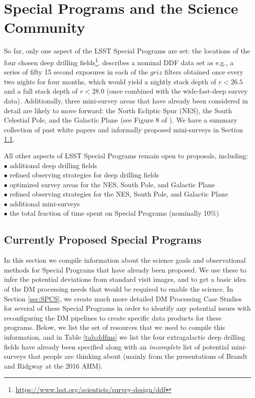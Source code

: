 \documentclass[DM,lsstdraft,toc]{lsstdoc}
\begin{document}
\clearpage
\section{Special Programs and the Science Community}\label{sec:SP_SC}

So far, only one aspect of the LSST Special Programs are set: the locations of the four chosen deep drilling fields\footnote{\url{https://www.lsst.org/scientists/survey-design/ddf}}. \cite{2008arXiv0805.2366I} describes a nominal DDF data set as e.g., a series of fifty 15 second exposures in each of the $griz$ filters obtained once every two nights for four months, which would yield a nightly stack depth of $r<26.5$ and a full stack depth of $r<28.0$ (once combined with the wide-fast-deep survey data). Additionally, three mini-survey areas that have already been considered in detail are likely to move forward: the North Ecliptic Spur (NES), the South Celestial Pole, and the Galactic Plane (see Figure 8 of \cite{2008arXiv0805.2366I}). We have a summary collection of past white papers and informally proposed mini-surveys in Section \ref{ssec:data_science}.

All other aspects of LSST Special Programs remain open to proposals, including: \\
$\bullet$ additional deep drilling fields \\
$\bullet$ refined observing strategies for deep drilling fields \\
$\bullet$ optimized survey areas for the NES, South Pole, and Galactic Plane \\
$\bullet$ refined observing strategies for the NES, South Pole, and Galactic Plane \\
$\bullet$ additional mini-surveys \\
$\bullet$ the total fraction of time spent on Special Programs (nominally 10\%)

\subsection{Currently Proposed Special Programs} \label{ssec:data_science}

In this section we compile information about the science goals and observational methods for Special Programs that have already been proposed. We use these to infer the potential deviations from standard visit images, and to get a basic idea of the DM processing needs that would be required to enable the science. In Section \ref{sec:SPCS}, we create much more detailed DM Processing Case Studies for several of these Special Programs in order to identify any potential issues with reconfiguring the DM pipelines to create specific data products for these programs. Below, we list the set of resources that we used to compile this information, and in Table \ref{tab:ddfms} we list the four extragalactic deep drilling fields have already been specified along with an {\it incomplete} list of potential mini-surveys that people are thinking about (mainly from the presentations of Brandt and Ridgway at the 2016 AHM).
\end{document}
